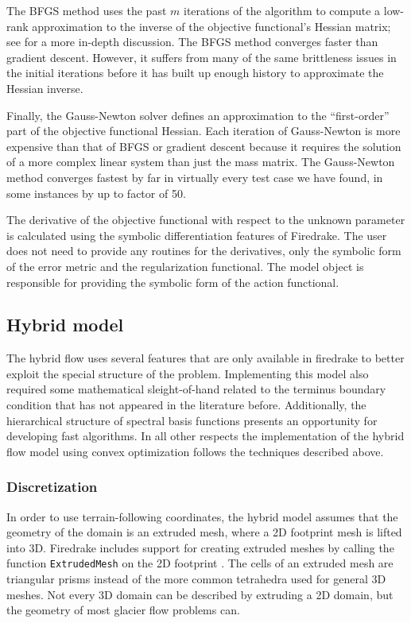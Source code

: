 \documentclass{article}
\theoremstyle{definition}
\theoremstyle{plain}
\begin{document}
The BFGS method uses the past $m$ iterations of the algorithm to compute a low-rank approximation to the inverse of the objective functional's Hessian matrix; see \citet{nocedal2006numerical} for a more in-depth discussion.
The BFGS method converges faster than gradient descent.
However, it suffers from many of the same brittleness issues in the initial iterations before it has built up enough history to approximate the Hessian inverse.

Finally, the Gauss-Newton solver defines an approximation to the ``first-order'' part of the objective functional Hessian.
Each iteration of Gauss-Newton is more expensive than that of BFGS or gradient descent because it requires the solution of a more complex linear system than just the mass matrix.
The Gauss-Newton method converges fastest by far in virtually every test case we have found, in some instances by up to factor of 50.

The derivative of the objective functional with respect to the unknown parameter is calculated using the symbolic differentiation features of Firedrake.
The user does not need to provide any routines for the derivatives, only the symbolic form of the error metric and the regularization functional.
The model object is responsible for providing the symbolic form of the action functional.


\subsection{Hybrid model}

The hybrid flow uses several features that are only available in firedrake to better exploit the special structure of the problem.
Implementing this model also required some mathematical sleight-of-hand related to the terminus boundary condition that has not appeared in the literature before.
Additionally, the hierarchical structure of spectral basis functions presents an opportunity for developing fast algorithms.
In all other respects the implementation of the hybrid flow model using convex optimization follows the techniques described above.

\subsubsection{Discretization}

In order to use terrain-following coordinates, the hybrid model assumes that the geometry of the domain is an extruded mesh, where a 2D footprint mesh is lifted into 3D.
Firedrake includes support for creating extruded meshes by calling the function \texttt{ExtrudedMesh} on the 2D footprint \citep{bercea2016structure}.
The cells of an extruded mesh are triangular prisms instead of the more common tetrahedra used for general 3D meshes.
Not every 3D domain can be described by extruding a 2D domain, but the geometry of most glacier flow problems can.
\end{document}
